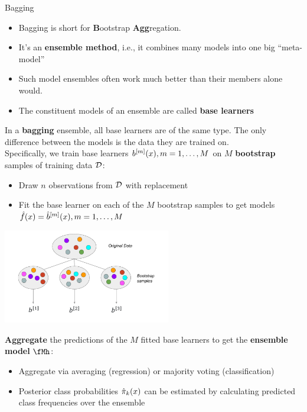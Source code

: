 \documentclass[11pt,compress,t,notes=noshow, xcolor=table]{beamer}
\begin{document}
\begin{vbframe}{Bagging}

\begin{itemize}
  \item Bagging is short for \textbf{B}ootstrap \textbf{Agg}regation.
  \item It's an \textbf{ensemble method}, i.e., it combines many models into one 
        big \enquote{meta-model}
  \item Such model ensembles often work much better than their members alone would.
  \item The constituent models of an ensemble are called \textbf{base learners} 
\end{itemize}

\framebreak 
In a \textbf{bagging} ensemble, all base learners are of the same type. The only difference between the models is the data they are trained on.\\
Specifically, we train base learners $b^{[m]}(x), m = 1, \dots, M$ on $M$ \textbf{bootstrap} samples of training data $\mathcal{D}$:
\begin{itemize}
  \item Draw $n$ observations from $\mathcal{D}$ with replacement
  \item Fit the base learner on each of the $M$ bootstrap samples to get models $\hat{f}(x) = \hat{b}^{[m]}(x), m = 1, \dots, M$
\end{itemize}

\begin{center}
\includegraphics[width=0.55\textwidth]{figure_man/bagging.pdf}
\end{center}

\framebreak

\textbf{Aggregate} the predictions of the $M$ fitted base learners to get the
\textbf{ensemble model} $\fMh$:
  \begin{itemize}
    \item Aggregate via averaging (regression) or majority voting (classification)
    \item Posterior class probabilities $\hat \pi_k(x)$ can be estimated by calculating predicted class frequencies over the ensemble
  \end{itemize}


\end{vbframe}
\end{document}
